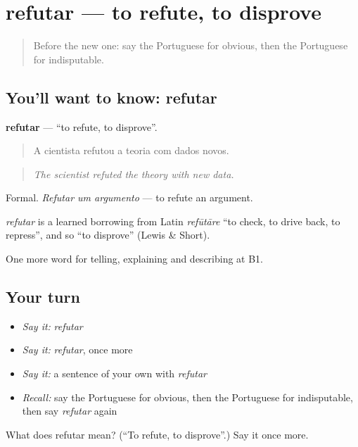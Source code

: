 \section[refutar]{refutar — to refute, to disprove}

\label{lesson:PT-C341-refutar}



\begin{quote}
Before the new one: say the Portuguese for obvious, then the Portuguese for indisputable.
\end{quote}

\subsection*{You'll want to know: refutar}
\textbf{refutar} — \textquotedblleft{}to refute, to disprove\textquotedblright{}.

\begin{quote}
A cientista refutou a teoria com dados novos.
\end{quote}

\begin{quote}
\emph{The scientist refuted the theory with new data.}
\end{quote}

Formal. \emph{Refutar um argumento} — to refute an argument.

\begin{cousinweb}
\emph{refutar} is a learned borrowing from Latin \emph{refūtāre} \textquotedblleft{}to check, to drive back, to repress\textquotedblright{}, and so \textquotedblleft{}to disprove\textquotedblright{} (Lewis \& Short).
\end{cousinweb}

\begin{grammarlens}[title={What you've built}]
One more word for telling, explaining and describing at B1.
\end{grammarlens}

\subsection*{Your turn}
\begin{itemize}
\raggedright
  \item \emph{Say it:} \emph{refutar}
  \item \emph{Say it:} \emph{refutar}, once more
  \item \emph{Say it:} a sentence of your own with \emph{refutar}
  \item \emph{Recall:} say the Portuguese for obvious, then the Portuguese for indisputable, then say \emph{refutar} again
\end{itemize}

\begin{tcolorbox}[breakable,colback=teal!4,colframe=teal!35!black,title={Before you move on}]
What does refutar mean? (\textquotedblleft{}To refute, to disprove\textquotedblright{}.) Say it once more.
\end{tcolorbox}
